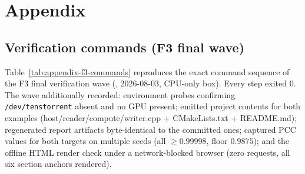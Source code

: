 \section{Appendix}\label{sec:appendix}

\subsection{Verification commands (F3 final wave)}\label{sec:appendix-f3}

Table~\ref{tab:appendix-f3-commands} reproduces the exact command sequence of
the F3 final verification wave
(, 2026-08-03, CPU-only box).
Every step exited 0. The wave additionally recorded: environment probes
confirming \texttt{/dev/tenstorrent} absent and no GPU present; emitted
project contents for both examples (host/reader/compute/writer.cpp +
CMakeLists.txt + README.md); regenerated report artifacts byte-identical to
the committed ones; captured PCC values for both targets on multiple seeds
(all $\ge 0.99998$, floor $0.9875$); and the offline HTML render check under
a network-blocked browser (zero requests, all six section anchors rendered).

